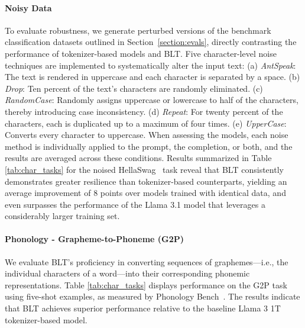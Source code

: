 \paragraph{Noisy Data} To evaluate robustness, we generate perturbed versions of the benchmark classification datasets outlined in Section~\ref{section:evals}, directly contrasting the performance of tokenizer-based models and {\textsc BLT}. Five character-level noise techniques are implemented to systematically alter the input text: (a) \textit{AntSpeak}: The text is rendered in uppercase and each character is separated by a space. (b) \textit{Drop}: Ten percent of the text's characters are randomly eliminated. (c) \textit{RandomCase}: Randomly assigns uppercase or lowercase to half of the characters, thereby introducing case inconsistency. (d) \textit{Repeat}: For twenty percent of the characters, each is duplicated up to a maximum of four times. (e) \textit{UpperCase}: Converts every character to uppercase. When assessing the models, each noise method is individually applied to the prompt, the completion, or both, and the results are averaged across these conditions. Results summarized in Table \ref{tab:char_tasks} for the noised HellaSwag~\citep{Eval_hellaswag} task reveal that {\textsc BLT} consistently demonstrates greater resilience than tokenizer-based counterparts, yielding an average improvement of 8 points over models trained with identical data, and even surpasses the performance of the Llama 3.1 model that leverages a considerably larger training set.

\paragraph{Phonology - Grapheme-to-Phoneme (G2P)} We evaluate {\textsc BLT}'s proficiency in converting sequences of graphemes—i.e., the individual characters of a word—into their corresponding phonemic representations. Table \ref{tab:char_tasks} displays performance on the G2P task using five-shot examples, as measured by Phonology Bench~\citep{suvarna2024phonologybench}. The results indicate that {\textsc BLT} achieves superior performance relative to the baseline Llama 3 1T tokenizer-based model.

